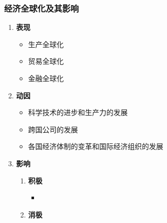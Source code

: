 \documentclass[12pt, a4paper, oneside]{ctexart}
\begin{document}
\subsubsection{经济全球化及其影响}

\begin{enumerate}
  \item {\bf 表现}
  
  \begin{itemize}
    \item 生产全球化
    \item 贸易全球化
    \item 金融全球化
  \end{itemize}

  \item {\bf 动因}
  
  \begin{itemize}
    \item 科学技术的进步和生产力的发展
    \item 跨国公司的发展
    \item 各国经济体制的变革和国际经济组织的发展
  \end{itemize}

  \item {\bf 影响}
  
  \begin{enumerate}
    \item {\bf 积极}
    
    \begin{itemize}
      \item 
    \end{itemize}
    
    \item {\bf 消极}
  \end{enumerate}

\end{enumerate}
\end{document}
